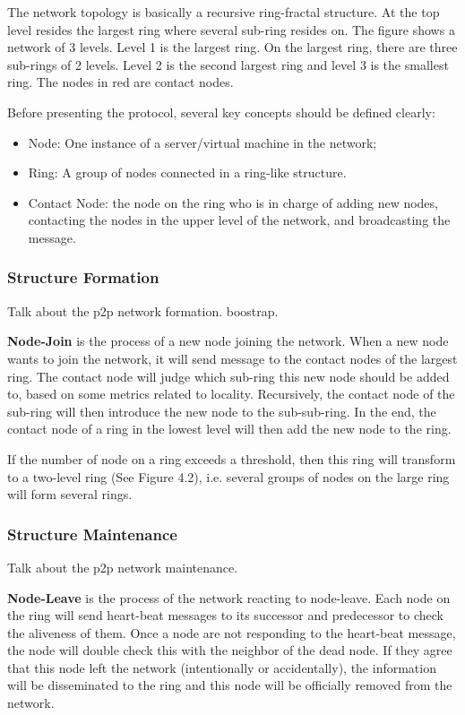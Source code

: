 The network topology is basically a recursive ring-fractal structure. At the top level resides the largest ring where several sub-ring resides on. The figure shows a network of 3 levels. Level 1 is the largest ring. On the largest ring, there are three sub-rings of 2 levels. Level 2 is the second largest ring and level 3 is the smallest ring. The nodes in red are contact nodes.

Before presenting the protocol, several key concepts should be defined clearly:
\begin{itemize}[noitemsep, topsep=0pt]
	\item Node: One instance of a server/virtual machine in the network;
	\item Ring: A group of nodes connected in a ring-like structure.
	\item Contact Node: the node on the ring who is in charge of adding new nodes, contacting the nodes in the upper level of the network, and broadcasting the message.
\end{itemize}

\subsubsection{Structure Formation} \label{formation}

Talk about the p2p network formation. boostrap.

\textbf{Node-Join} is the process of a new node joining the network. When a new node wants to join the network, it will send message to the contact nodes of the largest ring. The contact node will judge which sub-ring this new node should be added to, based on some metrics related to locality. Recursively, the contact node of the sub-ring will then introduce the new node to the sub-sub-ring. In the end, the contact node of a ring in the lowest level will then add the new node to the ring.

If the number of node on a ring exceeds a threshold, then this ring will transform to a two-level ring (See Figure 4.2), i.e. several groups of nodes on the large ring will form several rings.

\subsubsection{Structure Maintenance} \label{maintain}

Talk about the p2p network maintenance.

\textbf{Node-Leave} is the process of the network reacting to node-leave. Each node on the ring will send heart-beat messages to its successor and predecessor to check the aliveness of them. Once a node are not responding to the heart-beat message, the node will double check this with the neighbor of the dead node. If they agree that this node left the network (intentionally or accidentally), the information will be disseminated to the ring and this node will be officially removed from the network.

